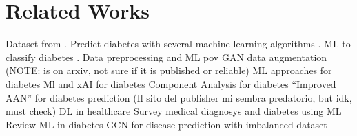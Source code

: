 \chapter{Related Works}\label{chap:related_works}
Dataset from \cite{smith1988using}.
Predict diabetes with several machine learning algorithms \cite{hasan2020diabetes}.
ML to classify diabetes \cite{chang2023pima}.
Data preprocessing and ML pov \cite{olisah2022diabetes}
GAN data augmentation \cite{tanaka2019data} (NOTE: is on arxiv, not sure if it is published or reliable)
ML approaches for diabetes \cite{maniruzzaman2017comparative}
Ml and xAI for diabetes \cite{tasin2023diabetes}
Component Analysis for diabetes \cite{gewers2021principal}
``Improved AAN'' for diabetes prediction \cite{bukhari2021improved} (Il sito del publisher mi sembra predatorio, but idk, must check)
DL in healthcare \cite{Kaul2022}
Survey medical diagnosys and diabetes using ML \cite{10.1007/978-981-13-1280-9_6}
Review ML in diabetes \cite{JAISWAL2021435}
GCN for disease prediction with imbalanced dataset \cite{GHORBANI2022102272}